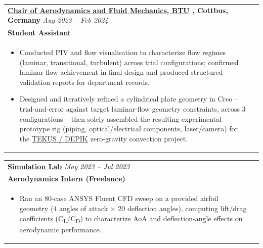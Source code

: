 \documentclass[a4paper,8pt]{article}
\newcommand{\ulhref}[2]{%
  {\hypersetup{urlcolor=.}\textcolor{.}{\href{#1}{\uline{#2}}}}%
}
\begin{document}
\begin{tabularx}{\linewidth}{ @{}l r@{} }
\textbf{{\ulhref{https://www.b-tu.de/fg-aerodynamik-stroemungslehre}{Chair of Aerodynamics and Fluid Mechanics, BTU}}, Cottbus, Germany} \hfill \color[HTML]{371e77} \textit{Aug 2023 – Feb 2024}\\[1pt]
\color[HTML]{371e77}\textbf{Student Assistant}\ \hfill \color[HTML]{4B28A4}  \\[1pt]
\begin{minipage}[t]{\linewidth}
    \begin{itemize}[nosep,after=\strut, leftmargin=*, itemsep=1pt]
        \item Conducted PIV and flow visualisation to characterize flow regimes (laminar, transitional, turbulent) across trial configurations; confirmed laminar flow achievement in final design and produced structured validation reports for department records.
        \item Designed and iteratively refined a cylindrical plate geometry in Creo -- trial-and-error against target laminar-flow geometry constraints, across 3 configurations -- then solely assembled the resulting experimental prototype rig (piping, optical/electrical components, laser/camera) for the \ulhref{https://www.b-tu.de/en/news/article/27186-weightless-research-btu-team-investigates-convection-currents-in-free-fall}{TEKUS / DEPIK} zero-gravity convection project.
    \end{itemize}
\end{minipage}
\end{tabularx}

\begin{tabularx}{\linewidth}{ @{}l r@{} }
\textbf{\ulhref{https://www.simulationlab.in/}{Simulation Lab}} \hfill \color[HTML]{371e77} \textit{May 2023 -- Jul 2023}\\[1pt]
\color[HTML]{371e77}\textbf{Aerodynamics Intern (Freelance)}\ \hfill \color[HTML]{4B28A4}  \\[1pt]
\begin{minipage}[t]{\linewidth}
    \begin{itemize}[nosep,after=\strut, leftmargin=*, itemsep=1pt]
        \item Ran an 80-case ANSYS Fluent CFD sweep on a provided airfoil geometry (4 angles of attack \(\times\) 20 deflection angles), computing lift/drag coefficients (C\textsubscript{L}/C\textsubscript{D}) to characterize AoA and deflection-angle effects on aerodynamic performance.
    \end{itemize}
\end{minipage}
\end{tabularx}
\end{document}
